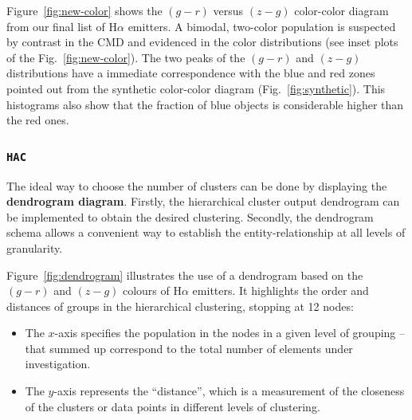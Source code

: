 \documentclass[fleqn,usenatbib]{mnras}
\begin{document}
Figure~\ref{fig:new-color} shows the $(g - r)$ versus $(z - g)$ color-color diagram from 
our final list of H{$\alpha$} emitters.
A bimodal, two-color population is suspected by contrast in the CMD and evidenced in the color distributions (see inset 
plots of the Fig.~\ref{fig:new-color}).
The two peaks of the $(g - r)$ and $(z - g)$ distributions have a immediate correspondence with the blue and red zones pointed out from the synthetic color-color diagram (Fig.~\ref{fig:synthetic}).
This histograms also
show that the fraction of blue objects is considerable higher than the red ones.

\subsubsection{\texttt{HAC}}

The ideal way to choose the number of clusters can be done by displaying the \textbf{dendrogram diagram}.
Firstly, the hierarchical cluster output dendrogram %
can be implemented to obtain the desired clustering. Secondly, the dendrogram schema allows 
a convenient way to establish the entity-relationship at all levels of granularity.

Figure~\ref{fig:dendrogram} illustrates the use of a dendrogram based on the $(g - r)$ and $(z - g)$ colours 
of H$\alpha$ emitters.
It highlights 
the order
and distances of groups in  the hierarchical clustering, stopping at 12 nodes:

\begin{itemize}
  
     \item The $x$-axis specifies the %
           population in the nodes in a given level of grouping -- that summed up correspond to the total number of elements under investigation.
     \item The $y$-axis represents the %
           ``distance'', which is a measurement of the closeness of the clusters or data points in different levels of clustering.
       
\end{itemize}
\end{document}
